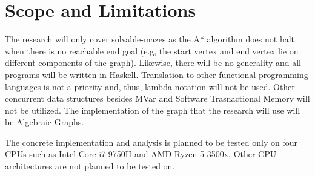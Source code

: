 \section{Scope and Limitations}

The research will only cover solvable-mazes as the A* algorithm does not halt when there is no reachable end goal (e.g,
the start vertex and end vertex lie on different components of the graph).\cite{HartNilssonRaphael1968} Likewise, there will be no generality
and all programs will be written in Haskell. Translation to other functional programming languages is not a priority and, thus,
lambda notation will not be used. Other concurrent data structures besides MVar and Software Trasnactional Memory will not be utilized. The 
implementation of the graph that the research will use will be Algebraic Graphs.\cite{Mokhov2017}

The concrete implementation and analysis is planned to be tested only on four CPUs such as Intel Core i7-9750H and AMD Ryzen 5 3500x.
Other CPU architectures are not planned to be tested on.
